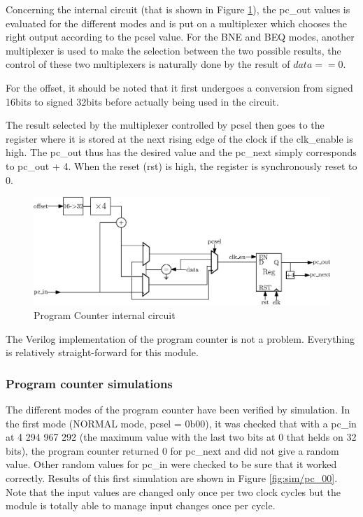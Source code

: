Concerning the internal circuit (that is shown in Figure \ref{fig:components/pc_in}), the pc\_out 
values is evaluated for the different modes and 
is put on a multiplexer which chooses the right output according to the pcsel value. For the BNE 
and BEQ modes, another multiplexer is used to make the selection between the two possible results, 
the control of these two multiplexers is naturally done by the result of $data == 0$. 

For the offset, it should be noted that it first undergoes a conversion from signed 16bits to 
signed 32bits before actually being used in the circuit.

The result selected by the multiplexer controlled by pcsel then goes to the register where it is 
stored at the next rising edge of the clock if the clk\_enable is high. The 
pc\_out thus has the desired value and the pc\_next simply corresponds to pc\_out + 4. When 
the reset (rst) is high, the register is synchronously reset to 0.

\begin{figure}[H]
    \centering
    \includegraphics[width=\linewidth]{Chapter3-CPU/res/pc_internal}
    \caption{Program Counter internal circuit}
    \label{fig:components/pc_in}
\end{figure}

The Verilog implementation of the program counter is not a problem. Everything is relatively 
straight-forward for this module.

\subsubsection*{Program counter simulations}

The different modes of the program counter have been verified by simulation. In the first mode 
(NORMAL mode, pcsel = 0b00), it was checked that with a pc\_in at 4 294 967 292 (the maximum value with 
the last two bits at 0 that helds on 32 bits), the program counter returned 0 for pc\_next and did not 
give a random value. Other random values for pc\_in were checked to be sure that it worked 
correctly. Results of this first simulation are shown in Figure \ref{fig:sim/pc_00}. Note that the
input values are changed only once per two clock cycles but the module is totally able to manage
input changes once per cycle.

